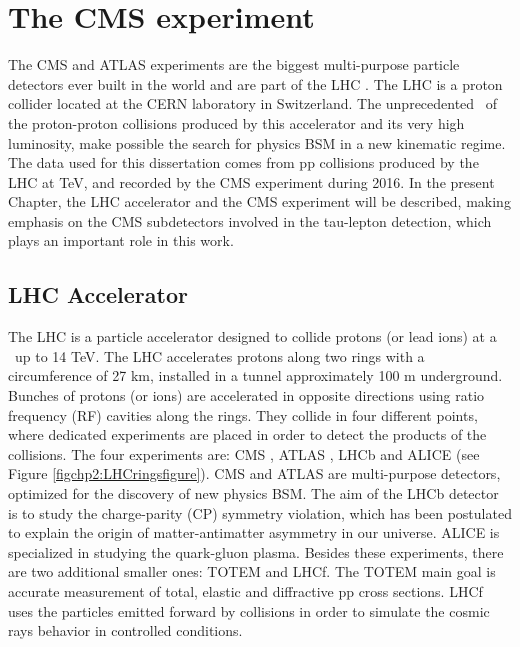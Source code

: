 \chapter[The CMS experiment]{The CMS experiment}
\label{chap:CMSExp}
The CMS and ATLAS experiments are the biggest multi-purpose particle detectors
ever built in the world and  are part of the LHC \cite{chp2:LHCTDR}. The LHC is a 
proton collider located at the CERN laboratory in Switzerland. The 
unprecedented \centermassenergy~of the proton-proton collisions 
produced by this accelerator and its very high luminosity, make possible the search
for physics BSM in a new kinematic regime. The data used for this dissertation comes from
pp collisions produced by the LHC at  TeV, and recorded by the CMS experiment during 2016.
In the present Chapter, the LHC accelerator and the CMS experiment will be
described, making emphasis on the CMS subdetectors involved in the 
tau-lepton detection, which plays an important role in this work. 


\section{LHC Accelerator}
\label{sec:LHC}
The LHC is a particle accelerator designed to collide protons (or lead ions) at 
a \centermassenergy~up to 14 TeV. The LHC accelerates protons along 
two rings with a circumference of 27 km, installed in a tunnel 
approximately 100 m underground. Bunches of protons (or ions)
are accelerated in opposite directions using ratio frequency (RF) cavities along the rings. They 
collide in four different points, where dedicated experiments are placed 
in order to detect the products of the collisions. The four experiments
are: CMS \cite{chp2:CMSTDR,chp2:CMSTDR2}, 
ATLAS \cite{chp2:ATLASTDR}, LHCb \cite{chp2:LHCb} and  ALICE \cite{chp2:ALICETDR} (see Figure \ref{figchp2:LHCringsfigure}). CMS 
and ATLAS are multi-purpose detectors, optimized for the discovery of new physics BSM. The aim of the LHCb detector is to study 
the charge-parity (CP) symmetry violation, which has been postulated to explain the origin of matter-antimatter 
asymmetry in our universe. ALICE is specialized in studying the quark-gluon plasma. Besides these experiments, there 
are two additional smaller ones: TOTEM and LHCf. The TOTEM main goal is accurate measurement of total, elastic and diffractive pp
cross sections. LHCf uses the particles emitted forward by collisions in order to simulate
the cosmic rays behavior in controlled conditions. 

